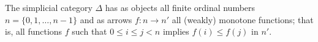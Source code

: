 The simplicial category $\Delta$ has as objects all finite ordinal numbers $n = \{0, 1, \ldots, n-1\}$ and as arrows $f : n \rightarrow n'$ all (weakly) monotone functions; that is, all functions $f$ such that $0 \leq i \leq j < n$ implies $f(i) \leq f(j)$ in $n'$.
